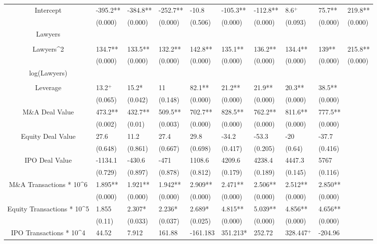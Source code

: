 \documentclass{article}
\begin{document}
\begin{table}[H]
\begin{tabular}{|clllllllll|}
Intercept & -395.2** & -384.8** & -252.7** & -10.8 & -105.3** & -112.8** & 8.6$^{+}$ & 75.7** & 219.8** \\
   & (0.000) & (0.000) & (0.000) & (0.506) & (0.000) & (0.000) & (0.093) & (0.000) & (0.000) \\
  Lawyers &  &  &  &  &  &  &  &  &  \\
   &  &  &  &  &  &  &  &  &  \\
  Lawyers^2 & 134.7** & 133.5** & 132.2** & 142.8** & 135.1** & 136.2** & 134.4** & 139** & 215.8** \\
   & (0.000) & (0.000) & (0.000) & (0.000) & (0.000) & (0.000) & (0.000) & (0.000) & (0.000) \\
  log(Lawyers) &  &  &  &  &  &  &  &  &  \\
   &  &  &  &  &  &  &  &  &  \\
  Leverage & 13.2$^{+}$ & 15.2* & 11 & 82.1** & 21.2** & 21.9** & 20.3** & 38.5** &  \\
   & (0.065) & (0.042) & (0.148) & (0.000) & (0.000) & (0.000) & (0.000) & (0.000) &  \\
  M\&A Deal Value & 473.2** & 432.7** & 509.5** & 702.7** & 828.5** & 762.2** & 811.6** & 777.5** &  \\
   & (0.002) & (0.01) & (0.003) & (0.000) & (0.000) & (0.000) & (0.000) & (0.000) &  \\
  Equity Deal Value & 27.6 & 11.2 & 27.4 & 29.8 & -34.2 & -53.3 & -20 & -37.7 &  \\
   & (0.648) & (0.861) & (0.667) & (0.698) & (0.417) & (0.205) & (0.64) & (0.416) &  \\
  IPO Deal Value & -1134.1 & -430.6 & -471 & 1108.6 & 4209.6 & 4238.4 & 4447.3 & 5767 &  \\
   & (0.729) & (0.897) & (0.878) & (0.812) & (0.179) & (0.189) & (0.145) & (0.116) &  \\
  M\&A Transactions * 10^6 & 1.895** & 1.921** & 1.942** & 2.909** & 2.471** & 2.506** & 2.512** & 2.850** &  \\
   & (0.000) & (0.000) & (0.000) & (0.000) & (0.000) & (0.000) & (0.000) & (0.000) &  \\
  Equity Transactions * 10^5 & 1.855 & 2.307* & 2.236* & 2.689* & 4.815** & 5.039** & 4.856** & 4.656** &  \\
   & (0.11) & (0.033) & (0.037) & (0.025) & (0.000) & (0.000) & (0.000) & (0.000) &  \\
  IPO Transactions * 10^4 & 44.52 & 7.912 & 161.88 & -161.183 & 351.213* & 252.72 & 328.447$^{+}$ & -204.96 &  \\

\end{tabular}
\end{table}
\end{document}
